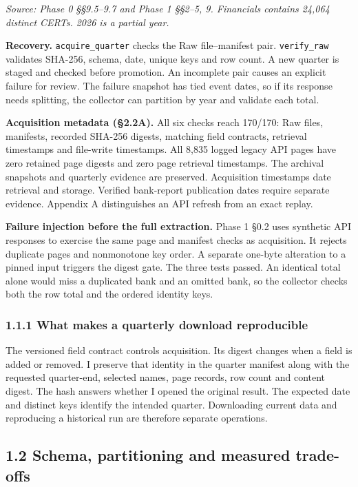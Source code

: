 \documentclass[
  12pt,
  a4paper,
]{article}
\newcommand{\notetext}[1]{\par{\fontsize{9.6pt}{11.6pt}\selectfont\itshape\color{sublabel}#1\par}}
\begin{document}
\notetext{Source: Phase 0 §§9.5–9.7 and Phase 1 §§2–5, 9. Financials contains 24,064 distinct CERTs. 2026 is a partial year.}

\textbf{Recovery.} \texttt{acquire\_quarter} checks the Raw
file--manifest pair. \texttt{verify\_raw} validates SHA-256, schema,
date, unique keys and row count. A new quarter is staged and checked
before promotion. An incomplete pair causes an explicit failure for
review. The failure snapshot has tied event dates, so if its response
needs splitting, the collector can partition by year and validate each
total.

\textbf{Acquisition metadata (§2.2A).} All six checks reach 170/170: Raw
files, manifests, recorded SHA-256 digests, matching field contracts,
retrieval timestamps and file-write timestamps. All 8,835 logged legacy
API pages have zero retained page digests and zero page retrieval
timestamps. The archival snapshots and quarterly evidence are preserved.
Acquisition timestamps date retrieval and storage. Verified bank-report
publication dates require separate evidence. Appendix A distinguishes an
API refresh from an exact replay.

\textbf{Failure injection before the full extraction.} Phase 1 §0.2 uses
synthetic API responses to exercise the same page and manifest checks as
acquisition. It rejects duplicate pages and nonmonotone key order. A
separate one-byte alteration to a pinned input triggers the digest gate.
The three tests passed. An identical total alone would miss a duplicated
bank and an omitted bank, so the collector checks both the row total and
the ordered identity keys.

\subsubsection{1.1.1 What makes a quarterly download
reproducible}\label{what-makes-a-quarterly-download-reproducible}

The versioned field contract controls acquisition. Its digest changes
when a field is added or removed. I preserve that identity in the
quarter manifest along with the requested quarter-end, selected names,
page records, row count and content digest. The hash answers whether I
opened the original result. The expected date and distinct keys identify
the intended quarter. Downloading current data and reproducing a
historical run are therefore separate operations.

\subsection{1.2 Schema, partitioning and measured
trade-offs}\label{schema-partitioning-and-measured-trade-offs}
\end{document}
